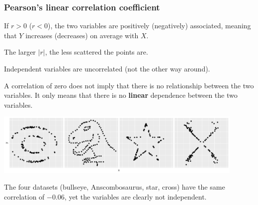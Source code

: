 \documentclass{beamer}
\begin{document}
\begin{frame}[fragile]
\frametitle{Pearson's linear correlation coefficient}
\bi
\item If $r>0$ ($r<0$), the two variables are positively (negatively) associated, meaning that $Y$ increases (decreases) on average with $X$.
\item The larger $|r|$, the less scattered the points are.

\item Independent variables are uncorrelated (not the other way around).
\item A correlation of zero does not imply that there is no relationship between the two variables.  It only means that there is no \textbf{linear} dependence between the two variables.

\ei

\begin{center}
 \includegraphics[width = 0.9\textwidth]{img/c2/03-linreg-datasaurus}
\end{center}
{\footnotesize
The four datasets (bullseye, Anscombosaurus, star, cross) have the same correlation of $-0.06$, yet the variables are clearly not independent.


}

\end{frame}
\end{document}
